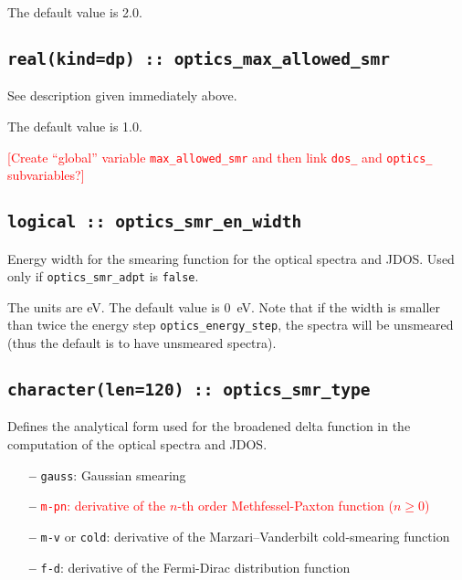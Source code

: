 The default value is 2.0.


\subsection[optics\_max\_allowed\_smr]{\tt real(kind=dp) ::
  optics\_max\_allowed\_smr}

See description given immediately above.

The default value is 1.0.

\textcolor{red}{[Create ``global'' variable {\tt max\_allowed\_smr} and then link
{\tt dos\_} and {\tt optics\_} subvariables?]}

\subsection[optics\_smr\_en\_width]{\tt logical :: optics\_smr\_en\_width}
Energy width for the smearing function for the optical spectra
and JDOS. Used only if {\tt optics\_smr\_adpt} is \verb#false#.

The units are eV. The default value is 0~eV. Note that if the width is
smaller than twice the energy step {\tt optics\_energy\_step}, the spectra
will be unsmeared (thus the default is to have unsmeared spectra).


\subsection[optics\_smr\_type]{\tt  character(len=120) :: optics\_smr\_type}

Defines the analytical form used for the broadened delta function in
the computation of the optical spectra and JDOS.

\begin{itemize}
  
\item[{\bf --}]
  {\tt gauss}: Gaussian smearing

\item[{\bf --}]
  \textcolor{red}{{\tt m-pn}: derivative of the $n$-th order
    Methfessel-Paxton function ($n\geq 0$)}

\item[{\bf --}]
  {\tt m-v} or {\tt cold}: derivative of the Marzari--Vanderbilt cold-smearing function

\item[{\bf --}]
  {\tt f-d}: derivative of the Fermi-Dirac distribution function

\end{itemize}

